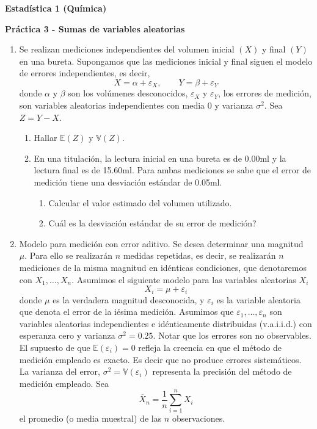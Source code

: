 \documentclass[a4paper, 11pt]{article}
\begin{document}
\begin{center}
\centerline{\bf Estadística 1 (Química)}%
\vspace{0.2cm}
\textbf{Práctica 3 - Sumas de variables aleatorias\vspace{-0.1in}}
\end{center}


\begin{enumerate}
\item Se realizan mediciones independientes del volumen inicial $\left(
X\right)  $ y final $\left(  Y\right)  $ en una bureta. Supongamos que las
mediciones inicial y final siguen el modelo de errores independientes, es
decir,
\[
X=\alpha+\varepsilon_{X},\qquad Y=\beta+\varepsilon_{Y}%
\]
donde $\alpha$ y $\beta$ son los volúmenes desconocidos, $\varepsilon_{X}$
y $\varepsilon_{Y}$, los errores de medición, son variables aleatorias
independientes con media 0 y varianza $\sigma^{2}$. Sea $Z=Y-X$.


\begin{enumerate}
\item Hallar $\mathbb{E}(Z)$ y $\mathbb{V}(Z)$.


\item En una titulación, la lectura inicial en una bureta es de 0.00ml y
la lectura final es de 15.60ml. Para ambas mediciones se sabe que el error de
medición tiene una desviación estándar de 0.05ml.


\begin{enumerate}
\item Calcular el valor estimado del volumen utilizado.


\item \textquestiondown Cuál es la desviación estándar de su error
de medición?
\end{enumerate}
\end{enumerate}








\item \label{medidas repetidas} Modelo para medici\'on  con error aditivo.  Se 
desea determinar una magnitud $\mu.$ Para ello se realizar\'an $n$ medidas 
repetidas, es decir, se realizarán $n$ mediciones de la misma magnitud en 
idénticas condiciones, que denotaremos con $X_{1},\dots,X_{n}$. Asumimos 
el siguiente modelo para las variables aleatorias $X_{i}$
\[
X_{i}=\mu+\varepsilon_{i}
\]
donde $\mu$ es la verdadera magnitud desconocida, y $\varepsilon_{i}$ es la
variable aleatoria que denota el error de la iésima medición. Asumimos
que $\varepsilon_{1},\dots,\varepsilon_{n}$ son variables aleatorias
independientes e idénticamente distribuidas (v.a.i.i.d.) con esperanza
cero y varianza $\sigma^{2}=0.25$. Notar que los errores son no observables. El
supuesto de que $\mathbb{E}(\varepsilon_{i})=0$ refleja la creencia en que el
método de medición empleado es exacto. Es decir que no produce errores
sistemáticos. La varianza del error, 
$\sigma^{2}=\mathbb{V}(\varepsilon_{i})$
representa la precisión del método de medición empleado. Sea
\[
\overline{X}_{n}=\frac{1}{n}\sum_{i=1}^{n}X_{i}
\]
el promedio (o media muestral) de las $n$ observaciones. 





\end{enumerate}
\end{document}
